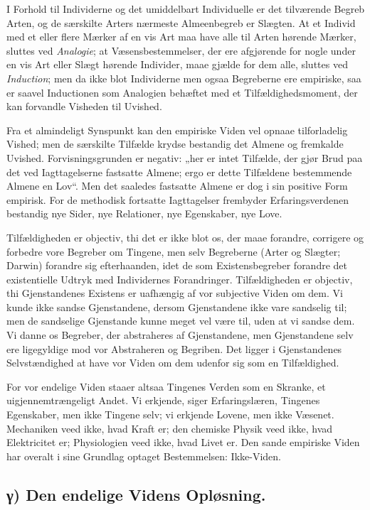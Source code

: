 \documentclass[12pt]{book}
\newcommand{\opage}[1]{\marginnote{\footnotesize\textit{[#1]}}}
\begin{document}
I Forhold til Individerne og det umiddelbart Individuelle er det
tilværende Begreb Arten, og de særskilte Arters nærmeste Almeenbegreb
er Slægten. At et Individ med et eller flere Mærker af en vis Art maa
have alle til Arten hørende Mærker, sluttes ved \emph{Analogie}; at
Væsensbestemmelser, der ere afgjørende for nogle under en vis Art
eller Slægt hørende Individer, maae gjælde for dem alle, sluttes ved
\emph{Induction}; men da ikke blot Individerne men ogsaa Begreberne
ere empiriske, saa er saavel Inductionen som Analogien behæftet med
et Tilfældighedsmoment, der kan forvandle Visheden til Uvished.

Fra et almindeligt Synspunkt kan den empiriske Viden vel opnaae
tilforladelig Vished; men de særskilte Tilfælde
\opage{12} krydse bestandig det Almene og fremkalde Uvished. Forvisningsgrunden
er negativ: „her er intet Tilfælde, der gjør Brud paa det ved
Iagttagelserne fastsatte Almene; ergo er dette Tilfældene bestemmende
Almene en Lov“. Men det saaledes fastsatte Almene er dog i sin
positive Form empirisk. For de methodisk fortsatte Iagttagelser
frembyder Erfaringsverdenen bestandig nye Sider, nye Relationer, nye
Egenskaber, nye Love.

Tilfældigheden er objectiv, thi det er ikke blot os, der maae
forandre, corrigere og forbedre vore Begreber om Tingene, men selv
Begreberne (Arter og Slægter; Darwin) forandre sig efterhaanden, idet
de som Existensbegreber forandre det existentielle Udtryk med
Individernes Forandringer. Tilfældigheden er objectiv, thi
Gjenstandenes Existens er uafhængig af vor subjective Viden om dem.
Vi kunde ikke sandse Gjenstandene, dersom Gjenstandene ikke vare
sandselig til; men de sandselige Gjenstande kunne meget vel være til,
uden at vi sandse dem. Vi danne os Begreber, der abstraheres af
Gjenstandene, men Gjenstandene selv ere ligegyldige mod vor
Abstraheren og Begriben. Det ligger i Gjenstandenes Selvstændighed at
have vor Viden om dem udenfor sig som en Tilfældighed.

For vor endelige Viden staaer altsaa Tingenes Verden som en Skranke,
et uigjennemtrængeligt Andet. Vi erkjende, siger Erfaringslæren,
Tingenes Egenskaber, men ikke Tingene selv; vi erkjende Lovene, men
ikke Væsenet. Mechaniken veed ikke, hvad Kraft er; den chemiske
Physik veed ikke, hvad Elektricitet er; Physiologien veed ikke, hvad
Livet er. Den sande empiriske Viden har overalt i sine Grundlag
optaget Bestemmelsen: Ikke-Viden.

\subsection*{γ) Den endelige Videns Opløsning.}
\end{document}
